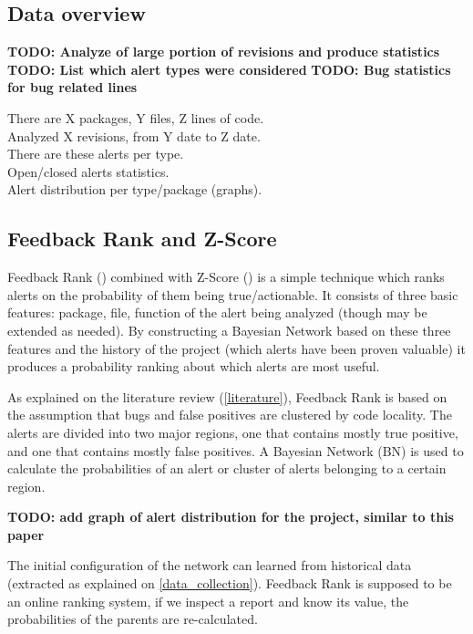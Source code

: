 \documentclass{article}
\begin{document}
\subsection{Data overview}

\textbf{TODO: Analyze of large portion of revisions and produce statistics}
\textbf{TODO: List which alert types were considered}
\textbf{TODO: Bug statistics for bug related lines}

There are X packages, Y files, Z lines of code.\\
Analyzed X revisions, from Y date to Z date.\\
There are these alerts per type.\\
Open/closed alerts statistics.\\
Alert distribution per type/package (graphs).\\


\subsection{Feedback Rank and Z-Score}


Feedback Rank (\cite{correlation_exploitation}) combined with Z-Score (\cite{z-ranking}) is a simple technique which ranks alerts on the probability of them being true/actionable. It consists of three basic features: package, file, function of the alert being analyzed (though may be extended as needed).
By constructing a Bayesian Network based on these three features and the history of the project (which alerts have been proven valuable) it produces a probability ranking about which alerts are most useful.

As explained on the literature review (\cref{literature}), Feedback Rank is based on the assumption that bugs and false positives are clustered by code locality. The alerts are divided into two major regions, one that contains mostly true positive, and one that contains mostly false positives. A Bayesian Network (BN) is used to calculate the probabilities of an alert or cluster of alerts belonging to a certain region.

\textbf{TODO: add graph of alert distribution for the project, similar to this paper}

The initial configuration of the network can learned from historical data (extracted as explained on \cref{data_collection}). Feedback Rank is supposed to be an online ranking system, if we inspect a report and know its value, the probabilities of the parents are re-calculated.
\end{document}
